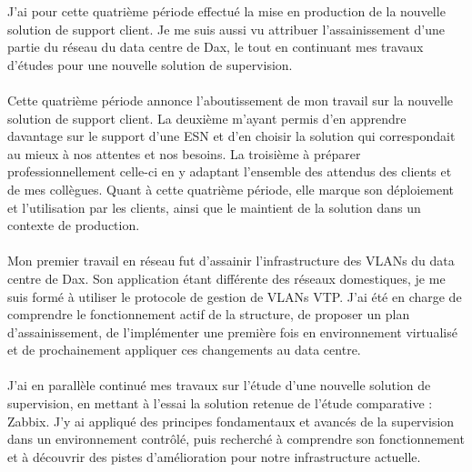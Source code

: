 \begin{resumo}
J'ai pour cette quatrième période effectué la mise en production de la nouvelle solution de support client. Je me suis aussi vu attribuer l'assainissement d'une partie du réseau du data centre de Dax, le tout en continuant mes travaux d'études pour une nouvelle solution de supervision.
\\ \\
Cette quatrième période annonce l'aboutissement de mon travail sur la nouvelle solution de support client. La deuxième m'ayant permis d'en apprendre davantage sur le support d'une ESN et d'en choisir la solution qui correspondait au mieux à nos attentes et nos besoins. La troisième à préparer professionnellement celle-ci en y adaptant l'ensemble des attendus des clients et de mes collègues. Quant à cette quatrième période, elle marque son déploiement et l'utilisation par les clients, ainsi que le maintient de la solution dans un contexte de production.
\\ \\
Mon premier travail en réseau fut d'assainir l'infrastructure des VLANs du data centre de Dax. Son application étant différente des réseaux domestiques, je me suis formé à utiliser le protocole de gestion de VLANs VTP. J'ai été en charge de comprendre le fonctionnement actif de la structure, de proposer un plan d'assainissement, de l'implémenter une première fois en environnement virtualisé et de prochainement appliquer ces changements au data centre.
\\ \\
J'ai en parallèle continué mes travaux sur l'étude d'une nouvelle solution de supervision, en mettant à l'essai la solution retenue de l'étude comparative : Zabbix. J'y ai appliqué des principes fondamentaux et avancés de la supervision dans un environnement contrôlé, puis recherché à comprendre son fonctionnement et à découvrir des pistes d'amélioration pour notre infrastructure actuelle.
    
    
\end{resumo}

